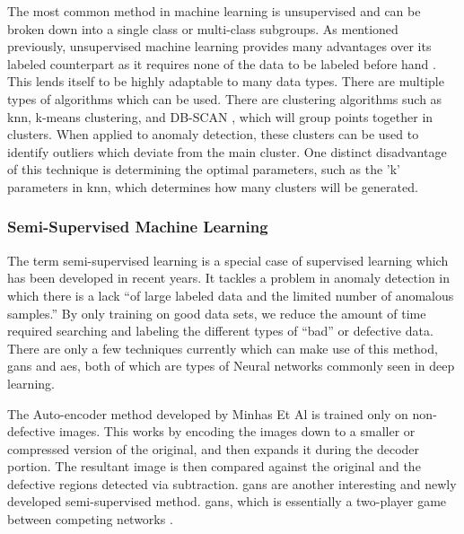 The most common method in machine learning is unsupervised and can be broken down into a single class or multi-class subgroups.  As mentioned previously, unsupervised machine learning provides many advantages over its labeled counterpart as it requires none of the data to be labeled before hand \cite{chandolaAnomalyDetectionSurveya}.  This lends itself to be highly adaptable to many data types. There are multiple types of algorithms which can be used.  There are clustering algorithms such as \gls{knn}, k-means clustering, and DB-SCAN \cite{xiaoweixuDistributionbasedClusteringAlgorithm1998}, which will group points together in clusters.  When applied to anomaly detection, these clusters can be used to identify outliers which deviate from the main cluster.  One distinct disadvantage of this technique is determining the optimal parameters, such as the 'k' parameters in \gls{knn}, which determines how many clusters will be generated.

\subsubsection{Semi-Supervised Machine Learning}

The term semi-supervised learning is a special case of supervised learning which has been developed in recent years.  It tackles a problem in anomaly detection in which there is a lack “of large labeled data and the limited number of anomalous samples.” \cite{} By only training on good data sets, we reduce the amount of time required searching and labeling the different types of “bad” or defective data. There are only a few techniques currently which can make use of this method, \glspl{gan} and \glspl{ae}, both of which are types of Neural networks commonly seen in deep learning. 

The Auto-encoder method developed by Minhas Et Al \cite{minhasSemisupervisedAnomalyDetection2019} is trained only on non-defective images. This works by encoding the images down to a smaller or compressed version of the original, and then expands it during the decoder portion.  The resultant image is then compared against the original and the defective regions detected via subtraction.  \glspl{gan} are another interesting and newly developed semi-supervised method.  \glspl{gan}, which is essentially a two-player game between competing networks \cite{goodfellowGenerativeAdversarialNetworks2014}.


%
%
%

